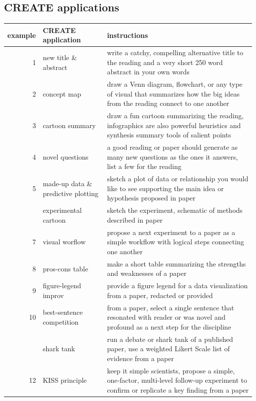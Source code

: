 \documentclass[
]{book}
\begin{document}
\hypertarget{create-applications}{%
\subsection*{CREATE applications}\label{create-applications}}

\begin{tabular}{rll}
\toprule
example & CREATE application & instructions\\
\midrule
1 & new title \& abstract & write a catchy, compelling alternative title to the reading and a very short 250 word abstract in your own words\\
2 & concept map & draw a Venn diagram, flowchart, or any type of visual that summarizes how the big ideas from the reading connect to one another\\
3 & cartoon summary & draw a fun cartoon summarizing the reading, infographics are also powerful heuristics and synthesis summary tools of salient points\\
4 & novel questions & a good reading or paper should generate as many new questions as the ones it answers, list a few for the reading\\
5 & made-up data \& predictive plotting & sketch a plot of data or relationship you would like to see supporting the main idea or hypothesis proposed in paper\\
\addlinespace
6 & experimental cartoon & sketch the experiment, schematic of methods described in paper\\
7 & visual worflow & propose a next experiment to a paper as a simple workflow with logical steps connecting one another\\
8 & pros-cons table & make a short table summarizing the strengths and weaknesses of a paper\\
9 & figure-legend improv & provide a figure legend for a data visualization from a paper, redacted or provided\\
10 & best-sentence competition & from a paper, select a single sentence that resonated with reader or was novel and profound as a next step for the discipline\\
\addlinespace
11 & shark tank & run a debate or shark tank of a published paper, use a weighted Likert Scale list of evidence from a paper\\
12 & KISS principle & keep it simple scientists, propose a simple, one-factor, multi-level follow-up experiment to confirm or replicate a key finding from a paper\\
\bottomrule
\end{tabular}
\end{document}

